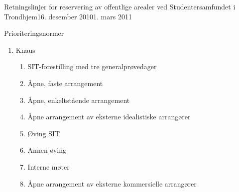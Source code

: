 \begin{instruks}{Retningslinjer for reservering av offentlige arealer
    ved Studentersamfundet i Trondhjem}{16. desember 2010}{1. mars 2011}
\begin{instruksledd}{Prioriteringsnormer}
\begin{enumerate}
\begin{enumerate}
\begin{enumerate}
                            \item Åpne, faste arrangement\footnote{Med ``åpne, faste
                                arrangement'' menes regelmessige arrangementer/konsepter som er åpne for alle og som
                                arrangeres av en av Samfundets gjenger.}
                            \item Fotball
                            \item Åpne, enkeltstående arrangement \footnote{Med ``åpne,
                                enkeltstående arrangement'' menes arrangementer som er åpne for alle og som arrangeres av en
                        av Samfundets gjenger, men som ikke faller inn under noe fast,
                        jevnlig konsept.}
                            \item Åpne arrangement av eksterne idealistiske arrangører (utlån)
                            \item Øvinger
                            \item Faste interne arrangement\footnote{For eksempel Mingle
                                Vingle}
                            \item Åpne arrangement av eksterne kommersielle arrangører (utleie)
                            \item Lukkete arrangement av eksterne arrangører (utleie)
                            \item  Interne møter
                            \item Interne fester
                        \end{enumerate}
                   \item Knaus
                        \begin{enumerate}
                            \item  SIT-forestilling med tre generalprøvedager
                            \item  Åpne, faste arrangement
                            \item  Åpne, enkeltstående arrangement
                            \item  Åpne arrangement av eksterne idealistiske arrangører
                            \item  Øving SIT
                            \item Annen øving
                            \item Interne møter
                            \item Åpne arrangement av eksterne kommersielle arrangører

\end{enumerate}
\end{enumerate}
\end{enumerate}
\end{instruksledd}
\end{instruks}
